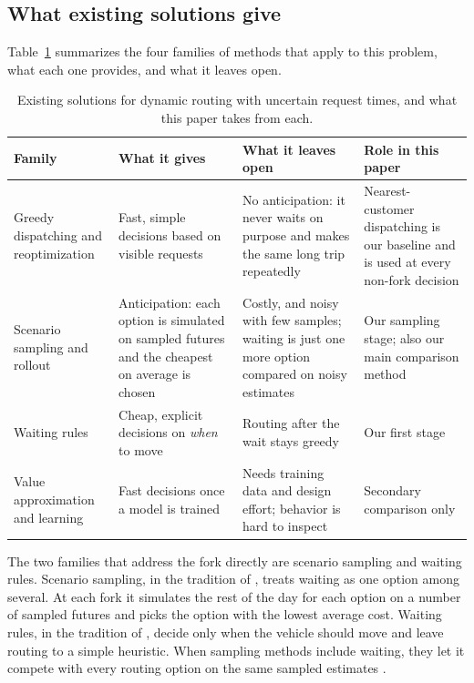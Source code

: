 \documentclass[5p,times,authoryear]{elsarticle}
\begin{document}
\subsection{What existing solutions give}

Table~\ref{tab:existing} summarizes the four families of methods that apply to this problem, what each one provides, and what it leaves open.

\begin{table}[t]
\centering
\caption{Existing solutions for dynamic routing with uncertain request times, and what this paper takes from each.}
\label{tab:existing}
\footnotesize
\setlength{\tabcolsep}{4pt}
\renewcommand{\arraystretch}{1.15}
\begin{tabular}{@{}>{\raggedright\arraybackslash}p{}>{\raggedright\arraybackslash}p{}>{\raggedright\arraybackslash}p{}>{\raggedright\arraybackslash}p{}@{}}
\toprule
Family & What it gives & What it leaves open & Role in this paper \\
\midrule
Greedy dispatching and reoptimization \citep{gendreau1999parallel,larsen2002partially} & Fast, simple decisions based on visible requests & No anticipation: it never waits on purpose and makes the same long trip repeatedly & Nearest-customer dispatching is our baseline and is used at every non-fork decision \\
Scenario sampling and rollout \citep{bent2004scenario,vanhentenryck2006online,goodson2017rollout} & Anticipation: each option is simulated on sampled futures and the cheapest on average is chosen & Costly, and noisy with few samples; waiting is just one more option compared on noisy estimates & Our sampling stage; also our main comparison method \\
Waiting rules \citep{mitrovic2004waiting,branke2005waiting,thomas2007waiting} & Cheap, explicit decisions on \emph{when} to move & Routing after the wait stays greedy & Our first stage \\
Value approximation and learning \citep{ulmer2019adp,kool2019attention,baty2024combinatorial} & Fast decisions once a model is trained & Needs training data and design effort; behavior is hard to inspect & Secondary comparison only \\
\bottomrule
\end{tabular}
\end{table}

The two families that address the fork directly are scenario sampling and waiting rules. Scenario sampling, in the tradition of \citet{bent2004scenario}, treats waiting as one option among several. At each fork it simulates the rest of the day for each option on a number of sampled futures and picks the option with the lowest average cost. Waiting rules, in the tradition of \citet{mitrovic2004waiting}, decide only when the vehicle should move and leave routing to a simple heuristic. When sampling methods include waiting, they let it compete with every routing option on the same sampled estimates \citep{bent2007waiting}.
\end{document}
